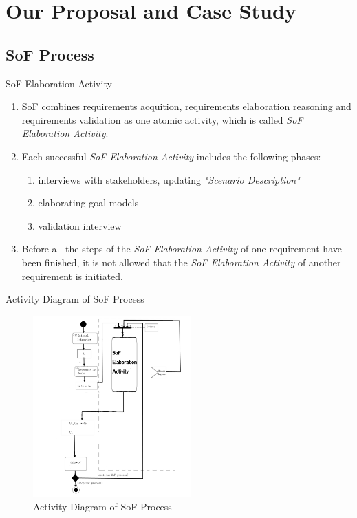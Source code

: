 \documentclass{beamer}
\begin{document}
\section{Our Proposal and Case Study}
\subsection{SoF Process}

\begin{frame}{SoF Elaboration Activity}
  \begin{enumerate}
  \item
    SoF combines requirements acquition, requirements elaboration reasoning and requirements validation as one atomic activity, which is called \emph{SoF Elaboration Activity}.
  \item
    Each successful \emph{SoF Elaboration Activity} includes the following phases: 
    \begin{enumerate}
    \item interviews with stakeholders, updating \emph{"Scenario Description"}
    \item elaborating goal models %
    \item validation interview
    \end{enumerate}
  \item
    Before all the steps of the \emph{SoF Elaboration Activity} of one requirement have been finished, it is not allowed that the \emph{SoF Elaboration Activity} of another requirement is initiated. 
  \end{enumerate}
\end{frame}

\begin{frame}{Activity Diagram of SoF Process}
  \begin{figure}
    \includegraphics[width=2.4in]{img/2_0.PNG}
    \caption{Activity Diagram of SoF Process}
  \end{figure}
\end{frame}  
\end{document}
